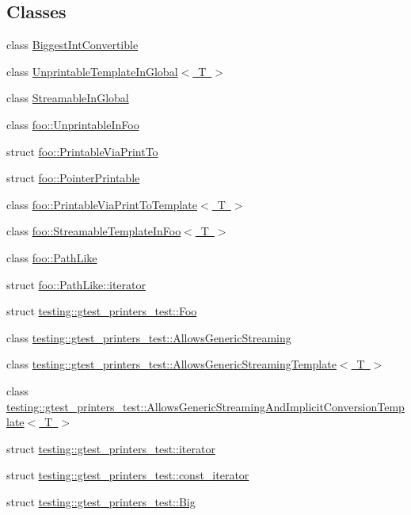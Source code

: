 \subsection*{Classes}
\begin{DoxyCompactItemize}
\item 
class \mbox{\hyperlink{classBiggestIntConvertible}{Biggest\+Int\+Convertible}}
\item 
class \mbox{\hyperlink{classUnprintableTemplateInGlobal}{Unprintable\+Template\+In\+Global$<$ T $>$}}
\item 
class \mbox{\hyperlink{classStreamableInGlobal}{Streamable\+In\+Global}}
\item 
class \mbox{\hyperlink{classfoo_1_1UnprintableInFoo}{foo\+::\+Unprintable\+In\+Foo}}
\item 
struct \mbox{\hyperlink{structfoo_1_1PrintableViaPrintTo}{foo\+::\+Printable\+Via\+Print\+To}}
\item 
struct \mbox{\hyperlink{structfoo_1_1PointerPrintable}{foo\+::\+Pointer\+Printable}}
\item 
class \mbox{\hyperlink{classfoo_1_1PrintableViaPrintToTemplate}{foo\+::\+Printable\+Via\+Print\+To\+Template$<$ T $>$}}
\item 
class \mbox{\hyperlink{classfoo_1_1StreamableTemplateInFoo}{foo\+::\+Streamable\+Template\+In\+Foo$<$ T $>$}}
\item 
class \mbox{\hyperlink{classfoo_1_1PathLike}{foo\+::\+Path\+Like}}
\item 
struct \mbox{\hyperlink{structfoo_1_1PathLike_1_1iterator}{foo\+::\+Path\+Like\+::iterator}}
\item 
struct \mbox{\hyperlink{structtesting_1_1gtest__printers__test_1_1Foo}{testing\+::gtest\+\_\+printers\+\_\+test\+::\+Foo}}
\item 
class \mbox{\hyperlink{classtesting_1_1gtest__printers__test_1_1AllowsGenericStreaming}{testing\+::gtest\+\_\+printers\+\_\+test\+::\+Allows\+Generic\+Streaming}}
\item 
class \mbox{\hyperlink{classtesting_1_1gtest__printers__test_1_1AllowsGenericStreamingTemplate}{testing\+::gtest\+\_\+printers\+\_\+test\+::\+Allows\+Generic\+Streaming\+Template$<$ T $>$}}
\item 
class \mbox{\hyperlink{classtesting_1_1gtest__printers__test_1_1AllowsGenericStreamingAndImplicitConversionTemplate}{testing\+::gtest\+\_\+printers\+\_\+test\+::\+Allows\+Generic\+Streaming\+And\+Implicit\+Conversion\+Template$<$ T $>$}}
\item 
struct \mbox{\hyperlink{structtesting_1_1gtest__printers__test_1_1iterator}{testing\+::gtest\+\_\+printers\+\_\+test\+::iterator}}
\item 
struct \mbox{\hyperlink{structtesting_1_1gtest__printers__test_1_1const__iterator}{testing\+::gtest\+\_\+printers\+\_\+test\+::const\+\_\+iterator}}
\item 
struct \mbox{\hyperlink{structtesting_1_1gtest__printers__test_1_1Big}{testing\+::gtest\+\_\+printers\+\_\+test\+::\+Big}}
\end{DoxyCompactItemize}
